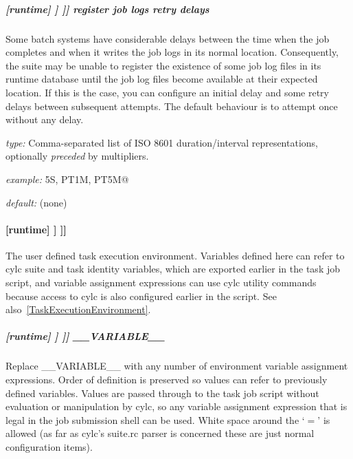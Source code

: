 \subparagraph[register job logs retry delays]{[runtime] \textrightarrow [[\_\_NAME\_\_]] \textrightarrow [[[events]]] \textrightarrow register job logs retry delays}

Some batch systems have considerable delays between the time when the job
completes and when it writes the job logs in its normal location. Consequently,
the suite may be unable to register the existence of some job log files in its
runtime database until the job log files become available at their expected
location. If this is the case, you can configure an initial delay and some
retry delays between subsequent attempts. The default behaviour is to attempt
once without any delay.

\begin{myitemize}
    \item {\em type:} Comma-separated list of ISO 8601 duration/interval
        representations, optionally {\em preceded} by multipliers.
    \item {\em example:} \lstinline@PT5S, PT1M, PT5M@
    \item {\em default:} (none)
\end{myitemize}

\paragraph[{[[[}environment{]]]}]{[runtime] \textrightarrow [[\_\_NAME\_\_]] \textrightarrow [[[environment]]]}

The user defined task execution environment. Variables defined here can
refer to cylc suite and task identity variables, which are exported
earlier in the task job script, and variable assignment expressions can
use cylc utility commands because access to cylc is also configured
earlier in the script.  See also~\ref{TaskExecutionEnvironment}.

\subparagraph[\_\_VARIABLE\_\_ ]{[runtime] \textrightarrow [[\_\_NAME\_\_]] \textrightarrow [[[environment]]] \textrightarrow \_\_VARIABLE\_\_}
\label{AppendixTaskExecutionEnvironment}

Replace \_\_VARIABLE\_\_ with any number of environment variable
assignment expressions.
Order of definition is preserved so values can refer to previously
defined variables. Values are passed through to the task job script
without evaluation or manipulation by cylc, so any variable assignment
expression that is legal in the job submission shell can be used.
White space around the `$=$' is allowed (as far as cylc's suite.rc
parser is concerned these are just normal configuration items).

